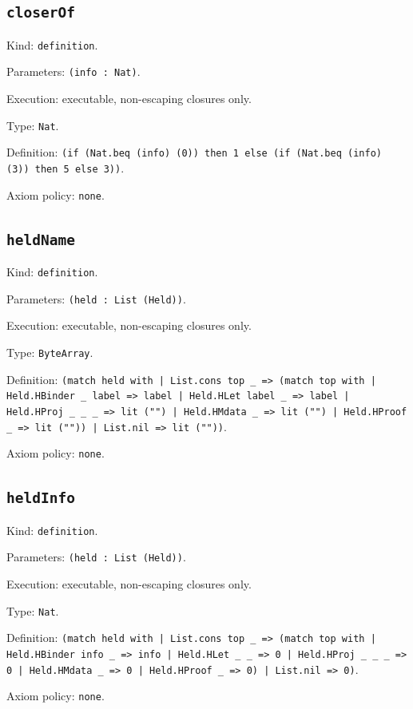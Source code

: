 \documentclass[11pt]{article}
\begin{document}
\subsection*{\texttt{closerOf}}
\noindent Kind: \texttt{definition}.\par
\noindent Parameters: \texttt{(info : Nat)}.\par
\noindent Execution: executable, non-escaping closures only.\par
\noindent Type: \texttt{Nat}.\par
\noindent Definition: \texttt{(if (Nat.beq (info) (0)) then 1 else (if (Nat.beq (info) (3)) then 5 else 3))}.\par
\noindent Axiom policy: \texttt{none}.\par
\subsection*{\texttt{heldName}}
\noindent Kind: \texttt{definition}.\par
\noindent Parameters: \texttt{(held : List (Held))}.\par
\noindent Execution: executable, non-escaping closures only.\par
\noindent Type: \texttt{ByteArray}.\par
\noindent Definition: \texttt{(match held with | List.cons top \_ => (match top with | Held.HBinder \_ label => label | Held.HLet label \_ => label | Held.HProj \_ \_ \_ => lit ("") | Held.HMdata \_ => lit ("") | Held.HProof \_ => lit ("")) | List.nil => lit (""))}.\par
\noindent Axiom policy: \texttt{none}.\par
\subsection*{\texttt{heldInfo}}
\noindent Kind: \texttt{definition}.\par
\noindent Parameters: \texttt{(held : List (Held))}.\par
\noindent Execution: executable, non-escaping closures only.\par
\noindent Type: \texttt{Nat}.\par
\noindent Definition: \texttt{(match held with | List.cons top \_ => (match top with | Held.HBinder info \_ => info | Held.HLet \_ \_ => 0 | Held.HProj \_ \_ \_ => 0 | Held.HMdata \_ => 0 | Held.HProof \_ => 0) | List.nil => 0)}.\par
\noindent Axiom policy: \texttt{none}.\par
\end{document}
